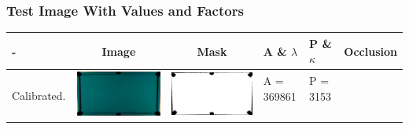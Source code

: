 \subsubsection{Test Image With Values and Factors}
\begin{tabular}{|l|c|c|l|l|c|}
\hline - & Image & Mask & A \& $\lambda$ & P \& $\kappa$ & Occlusion \\ 
\hline

\multirow{4}{*}{Calibrated.} & \multirow{4}{*}{\includegraphics[scale=0.1]{../images/1/calibimg.png}} & \multirow{4}{*}{\includegraphics[scale=0.1]{../images/1/calibmask.png}} & A = 369861 & P = 3153  & \multirow{4}{*}{}\\  
& & & & & \\
&&&&&\\
&&&&&\\
\hline


\end{tabular}

